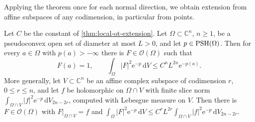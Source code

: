 Applying the theorem once for each normal direction, we obtain extension from affine subspaces of any codimension, in particular from points.

\begin{corollary}\label{cor:ot-point-value-bound}
Let $C$ be the constant of \cref{thm:local-ot-extension}. Let $\Omega\subset\mathbb C^n$, $n\ge1$, be a pseudoconvex open set of diameter at most $L>0$, and let $p\in\mathrm{PSH}(\Omega)$. Then for every $a\in\Omega$ with $p(a)>-\infty$ there is $F\in\mathcal O(\Omega)$ such that
\[
 F(a)=1,\qquad\int_\Omega|F|^2\mathrm e^{-p}\,\mathrm dV
                       \le C^n L^{2n}\mathrm e^{-p(a)}.
\]
More generally, let $V\subset\mathbb C^n$ be an affine complex subspace of codimension $r$, $0\le r\le n$, and let $f$ be holomorphic on $\Omega\cap V$ with finite slice norm $\int_{\Omega\cap V}|f|^2\mathrm e^{-p}\,\mathrm dV_{2n-2r}$, computed with Lebesgue measure on $V$. Then there is $F\in\mathcal O(\Omega)$ with $F|_{\Omega\cap V}=f$ and $\int_\Omega|F|^2\mathrm e^{-p}\,\mathrm dV\le C^rL^{2r}\int_{\Omega\cap V}|f|^2\mathrm e^{-p}\,\mathrm dV_{2n-2r}$.
\end{corollary}
